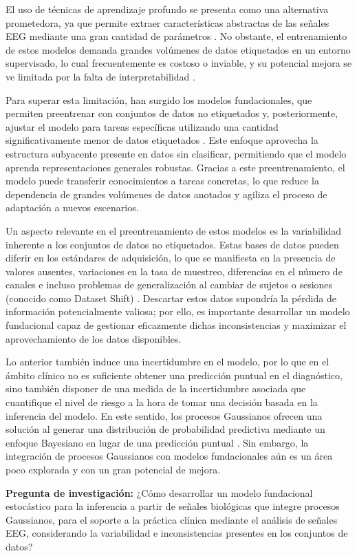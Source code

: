 El uso de técnicas de aprendizaje profundo se presenta como una alternativa prometedora, ya que permite extraer características abstractas de las señales EEG mediante una gran cantidad de parámetros \cite{Jahani2024,Garcia-Argibay2023,Moghaddari2020}. No obstante, el entrenamiento de estos modelos demanda grandes volúmenes de datos etiquetados en un entorno supervisado, lo cual frecuentemente es costoso o inviable, y su potencial mejora se ve limitada por la falta de interpretabilidad \cite{emam2021statedatacomputervision,healthcare11030285}.

Para superar esta limitación, han surgido los modelos fundacionales, que permiten preentrenar con conjuntos de datos no etiquetados y, posteriormente, ajustar el modelo para tareas específicas utilizando una cantidad significativamente menor de datos etiquetados \cite{Mathew2024,Abbaspourazad2023}. Este enfoque aprovecha la estructura subyacente presente en datos sin clasificar, permitiendo que el modelo aprenda representaciones generales robustas. Gracias a este preentrenamiento, el modelo puede transferir conocimientos a tareas concretas, lo que reduce la dependencia de grandes volúmenes de datos anotados y agiliza el proceso de adaptación a nuevos escenarios. 

Un aspecto relevante en el preentrenamiento de estos modelos es la variabilidad inherente a los conjuntos de datos no etiquetados. Estas bases de datos pueden diferir en los estándares de adquisición, lo que se manifiesta en la presencia de valores ausentes, variaciones en la tasa de muestreo, diferencias en el número de canales e incluso problemas de generalización al cambiar de sujetos o sesiones (conocido como Dataset Shift) \cite{APICELLA2024128354}. Descartar estos datos supondría la pérdida de información potencialmente valiosa; por ello, es importante desarrollar un modelo fundacional capaz de gestionar eficazmente dichas inconsistencias y maximizar el aprovechamiento de los datos disponibles.

Lo anterior también induce una incertidumbre en el modelo, por lo que en el ámbito clínico no es suficiente obtener una predicción puntual en el diagnóstico, sino también disponer de una medida de la incertidumbre asociada que cuantifique el nivel de riesgo a la hora de tomar una decisión basada en la inferencia del modelo. En este sentido, los procesos Gaussianos ofrecen una solución al generar una distribución de probabilidad predictiva mediante un enfoque Bayesiano en lugar de una predicción puntual \cite{GUTIERREZBECKER2018246,Jahani2024}. Sin embargo, la integración de procesos Gaussianos con modelos fundacionales aún es un área poco explorada y con un gran potencial de mejora.

\textbf{Pregunta de investigación:}  
¿Cómo desarrollar un modelo fundacional estocástico para la inferencia a partir de señales biológicas que integre procesos Gaussianos, para el soporte a la práctica clínica mediante el análisis de señales EEG, considerando la variabilidad e inconsistencias presentes en los conjuntos de datos?
